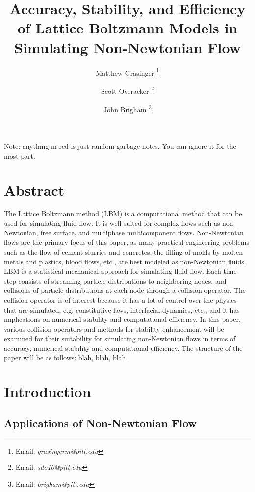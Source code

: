 \documentclass{article}
\title{Accuracy, Stability, and Efficiency of Lattice Boltzmann Models in Simulating Non-Newtonian Flow}
\author{{Matthew Grasinger}
\thanks{Email: \textit{grasingerm@pitt.edu}}}
\author{{Scott Overacker}
	\thanks{Email: \textit{sdo10@pitt.edu}}}
\author{John Brigham
\thanks{Email: \textit{brigham@pitt.edu}}}
\affil{Civil and Environmental Engineering Department, University of Pittsburgh}
\begin{document}
\maketitle
\newpage
\tableofcontents
\newpage
{}

\linenumbers

Note: anything in {\color{red}red} is just random garbage notes.
You can ignore it for the most part.

\section*{Abstract}

The Lattice Boltzmann method (LBM) is a computational method that can be used for simulating fluid flow.
It is well-suited for complex flows such as non-Newtonian, free surface, and multiphase multicomponent flows.
Non-Newtonian flows are the primary focus of this paper, as many practical engineering problems such as the flow of cement slurries and concretes, the filling of molds by molten metals and plastics, blood flows, etc., are best modeled as non-Newtonian fluids.
LBM is a statistical mechanical approach for simulating fluid flow.
Each time step consists of streaming particle distributions to neighboring nodes, and collisions of particle distributions at each node through a collision operator.
The collision operator is of interest because it has a lot of control over the physics that are simulated, e.g. constitutive laws, interfacial dynamics, etc., and it has implications on numerical stability and computational efficiency.
In this paper, various collision operators and methods for stability enhancement will be examined for their suitability for simulating non-Newtonian flows in terms of accuracy, numerical stability and computational efficiency.
The structure of the paper will be as follows: blah, blah, blah.

\section{Introduction} %

\subsection{Applications of Non-Newtonian Flow}
\end{document}
